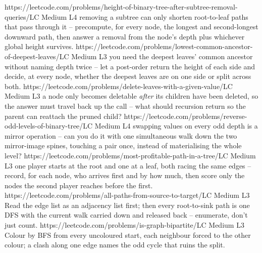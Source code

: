 \begin{mixedset}
    {https://leetcode.com/problems/height-of-binary-tree-after-subtree-removal-queries/}{LC Medium L4}
    {removing a subtree can only shorten root-to-leaf paths that pass through it -- precompute,
    for every node, the longest and second-longest downward path, then answer a removal from
    the node's depth plus whichever global height survives.}
    {https://leetcode.com/problems/lowest-common-ancestor-of-deepest-leaves/}{LC Medium L3}
    {you need the deepest leaves' common ancestor without naming depth twice -- let a
    post-order return the height of each side and decide, at every node, whether the deepest
    leaves are on one side or split across both.}
    {https://leetcode.com/problems/delete-leaves-with-a-given-value/}{LC Medium L3}
    {a node only becomes deletable \emph{after} its children have been deleted, so the answer
    must travel back up the call -- what should recursion return so the parent can reattach
    the pruned child?}
    {https://leetcode.com/problems/reverse-odd-levels-of-binary-tree/}{LC Medium L4}
    {swapping values on every odd depth is a mirror operation -- can you do it with one
    simultaneous walk down the two mirror-image spines, touching a pair once, instead of
    materialising the whole level?}
    {https://leetcode.com/problems/most-profitable-path-in-a-tree/}{LC Medium L3}
    {one player starts at the root and one at a leaf, both racing the same edges -- record,
    for each node, who arrives first and by how much, then score only the nodes the second
    player reaches before the first.}
    {https://leetcode.com/problems/all-paths-from-source-to-target/}{LC Medium L3}
    {Read the edge list as an adjacency list first; then every root-to-sink path is
    one DFS with the current walk carried down and released back -- enumerate, don't
    just count.}
    {https://leetcode.com/problems/is-graph-bipartite/}{LC Medium L3}
    {Colour by BFS from every uncoloured start, each neighbour forced to the other
    colour; a clash along one edge names the odd cycle that ruins the split.}

\end{mixedset}
